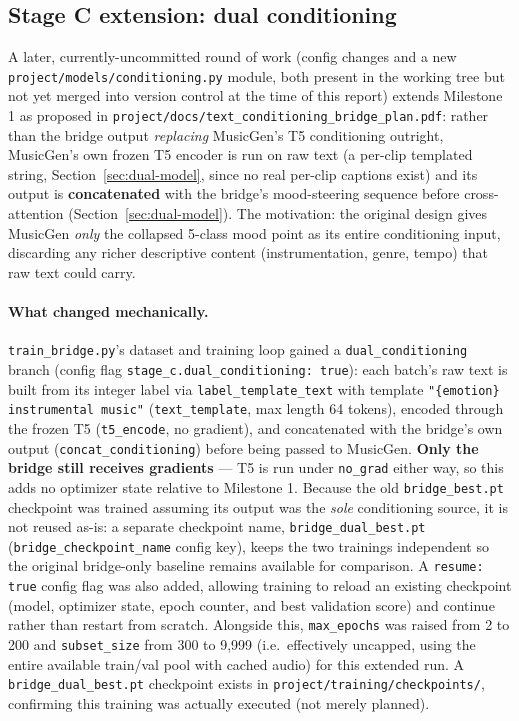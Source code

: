 \documentclass[11pt]{article}
\begin{document}
\subsection{Stage C extension: dual conditioning}
\label{sec:dual}
A later, currently-uncommitted round of work (config changes and a new
\texttt{project/models/conditioning.py} module, both present in the working tree but not yet
merged into version control at the time of this report) extends Milestone 1 as proposed in
\texttt{project/docs/text\_conditioning\_bridge\_plan.pdf}: rather than the bridge output
\emph{replacing} MusicGen's T5 conditioning outright, MusicGen's own frozen T5 encoder is run on
raw text (a per-clip templated string, Section~\ref{sec:dual-model}, since no real per-clip
captions exist) and its output is \textbf{concatenated} with the bridge's mood-steering sequence
before cross-attention (Section~\ref{sec:dual-model}). The motivation: the original design gives
MusicGen \emph{only} the collapsed 5-class mood point as its entire conditioning input, discarding
any richer descriptive content (instrumentation, genre, tempo) that raw text could carry.

\paragraph{What changed mechanically.} \texttt{train\_bridge.py}'s dataset and training loop gained
a \texttt{dual\_conditioning} branch (config flag \texttt{stage\_c.dual\_conditioning: true}): each
batch's raw text is built from its integer label via \texttt{label\_template\_text} with template
\texttt{"\{emotion\} instrumental music"} (\texttt{text\_template}, max length 64 tokens), encoded
through the frozen T5 (\texttt{t5\_encode}, no gradient), and concatenated with the bridge's own
output (\texttt{concat\_conditioning}) before being passed to MusicGen. \textbf{Only the bridge
still receives gradients} --- T5 is run under \texttt{no\_grad} either way, so this adds no
optimizer state relative to Milestone 1. Because the old \texttt{bridge\_best.pt} checkpoint was
trained assuming its output was the \emph{sole} conditioning source, it is not reused as-is: a
separate checkpoint name, \texttt{bridge\_dual\_best.pt} (\texttt{bridge\_checkpoint\_name} config
key), keeps the two trainings independent so the original bridge-only baseline remains available
for comparison. A \texttt{resume: true} config flag was also added, allowing training to reload an
existing checkpoint (model, optimizer state, epoch counter, and best validation score) and continue
rather than restart from scratch. Alongside this, \texttt{max\_epochs} was raised from 2 to 200 and
\texttt{subset\_size} from 300 to 9{,}999 (i.e.\ effectively uncapped, using the entire available
train/val pool with cached audio) for this extended run. A \texttt{bridge\_dual\_best.pt} checkpoint
exists in \texttt{project/training/checkpoints/}, confirming this training was actually executed
(not merely planned).
\end{document}
